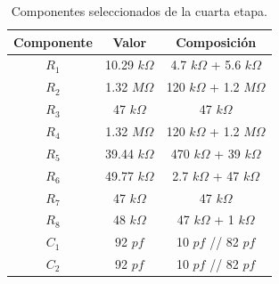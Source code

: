\begin{multicols}{2}
\begin{table}[H]
\centering
\begin{tabular}{ccc}
\hline
\multicolumn{1}{c}{Componente} & \multicolumn{1}{c}{Valor} & Composición \\ \hline
$R_1$                           & 10.29 $k\Omega$                     & 4.7 $k\Omega$ + 5.6 $k\Omega$   \\
$R_2$                           & 1.32 $M\Omega$                      & 120 $k\Omega$ + 1.2 $M\Omega$   \\
$R_3$                           & 47 $k\Omega$                        & 47 $k\Omega$         \\
$R_4$                           & 1.32 $M\Omega$                      & 120 $k\Omega$ + 1.2 $M\Omega$   \\
$R_5$                           & 39.44 $k\Omega$                     & 470 $k\Omega$ + 39 $k\Omega$     \\
$R_6$                           & 49.77 $k\Omega$                     & 2.7 $k\Omega$ + 47 $k\Omega$    \\
$R_7$                           & 47 $k\Omega$                        & 47 $k\Omega$         \\
$R_8$                           & 48 $k\Omega$                        & 47 $k\Omega$ + 1 $k\Omega$         \\
$C_1$                           & 92 $pf$                        & 10 $pf$ // 82 $pf$  \\
$C_2$                           & 92 $pf$                        & 10 $pf$ // 82 $pf$  \\
\hline
\end{tabular}
\caption{Componentes seleccionados de la cuarta etapa.}
\end{table}
\end{multicols}

